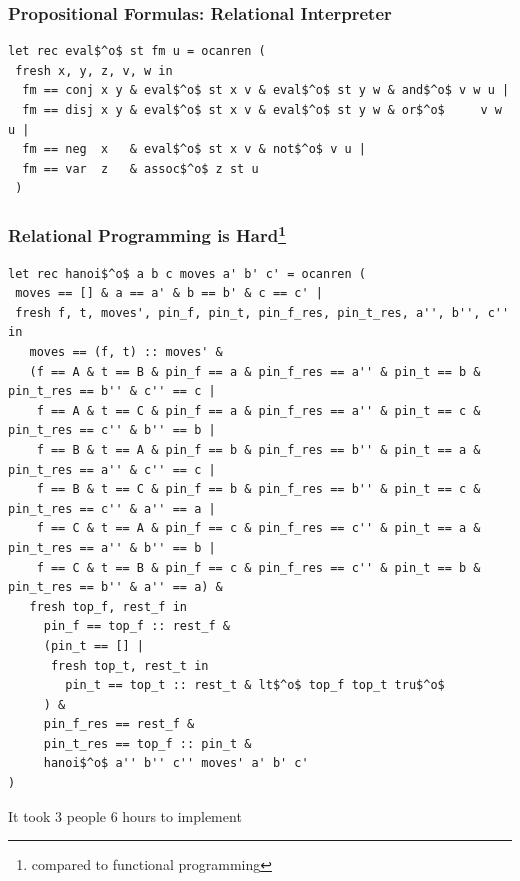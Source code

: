 \documentclass[xcolor=table]{beamer}
\begin{document}
\begin{frame}[fragile]
  \transwipe[direction=90]
  \frametitle{Propositional Formulas: Relational Interpreter}

\begin{lstlisting}
let rec eval$^o$ st fm u = ocanren (
 fresh x, y, z, v, w in
  fm == conj x y & eval$^o$ st x v & eval$^o$ st y w & and$^o$ v w u |
  fm == disj x y & eval$^o$ st x v & eval$^o$ st y w & or$^o$     v w u |
  fm == neg  x   & eval$^o$ st x v & not$^o$ v u |
  fm == var  z   & assoc$^o$ z st u
 )
\end{lstlisting}

\end{frame}

\begin{frame}[fragile]
  \transwipe[direction=90]
  \frametitle{Relational Programming is Hard\footnote{compared to functional programming}}
\begin{lstlisting}[basicstyle=\tiny]
let rec hanoi$^o$ a b c moves a' b' c' = ocanren (
 moves == [] & a == a' & b == b' & c == c' |
 fresh f, t, moves', pin_f, pin_t, pin_f_res, pin_t_res, a'', b'', c'' in
   moves == (f, t) :: moves' &
   (f == A & t == B & pin_f == a & pin_f_res == a'' & pin_t == b & pin_t_res == b'' & c'' == c |
    f == A & t == C & pin_f == a & pin_f_res == a'' & pin_t == c & pin_t_res == c'' & b'' == b |
    f == B & t == A & pin_f == b & pin_f_res == b'' & pin_t == a & pin_t_res == a'' & c'' == c |
    f == B & t == C & pin_f == b & pin_f_res == b'' & pin_t == c & pin_t_res == c'' & a'' == a |
    f == C & t == A & pin_f == c & pin_f_res == c'' & pin_t == a & pin_t_res == a'' & b'' == b |
    f == C & t == B & pin_f == c & pin_f_res == c'' & pin_t == b & pin_t_res == b'' & a'' == a) &
   fresh top_f, rest_f in
     pin_f == top_f :: rest_f &
     (pin_t == [] |
      fresh top_t, rest_t in
        pin_t == top_t :: rest_t & lt$^o$ top_f top_t tru$^o$
     ) &
     pin_f_res == rest_f &
     pin_t_res == top_f :: pin_t &
     hanoi$^o$ a'' b'' c'' moves' a' b' c'
)
\end{lstlisting}

\begin{center} It took 3 people 6 hours to implement  \end{center}
\end{frame}
\end{document}
